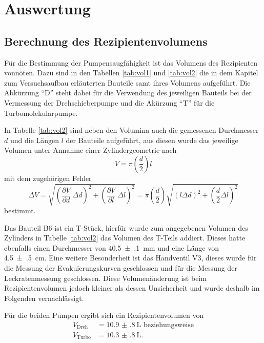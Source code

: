 \newpage
\section{Auswertung}
\label{sec:Auswertung}

\subsection{Berechnung des Rezipientenvolumens}
\label{sec:Volumina}

Für die Bestimmung der Pumpensaugfähigkeit ist das Volumens des Rezipienten
vonnöten. Dazu sind in den Tabellen \ref{tab:vol1} und \ref{tab:vol2} die
in dem Kapitel zum Versuchsaufbau erläuterten Bauteile samt ihres Volumens aufgeführt.
Die Abkürzung \enquote{D} steht dabei für die Verwendung
des jeweiligen Bauteils bei der Vermessung der
Drehschieberpumpe und die Akürzung \enquote{T} für die Turbomolekularpumpe.



In Tabelle \ref{tab:vol2} sind neben den Volumina auch die gemessenen
Durchmesser $d$ und die Längen $l$ der Bauteile aufgeführt, aus diesen wurde
das jeweilige Volumen unter Annahme einer Zylindergeometrie nach
\begin{equation*}
  V = \pi \left(\frac{d}{2}\right) l
\end{equation*}
mit dem zugehörigen Fehler
\begin{equation*}
  \Delta V =
  \sqrt{\left(\frac{\partial V}{\partial d} \;\Delta d\right)^2 +
  \left(\frac{\partial V}{\partial l} \;\Delta l\right)^2} =
  \pi \left(\frac{d}{2}\right) \sqrt{
  \left(l \Delta d \right)^2 +
  \left( \frac{d}{2} \Delta l\right)^2}
\end{equation*}
bestimmt.



Das Bauteil B6 ist ein T-Stück, hierfür wurde zum angegebenen Volumen des Zylinders
in Tabelle \ref{tab:vol2}
das Volumen des T-Teils addiert. Dieses hatte ebenfalls einen Durchmesser
von \SI{40.5(1)}{\milli\meter} und eine Länge von \SI{4.5(5)}{\centi\meter}.
Eine weitere Besonderheit ist das Handventil V3, dieses wurde für die Messung
der Evakuierungskurven geschlossen und für die Messung der Leckratenmessung
geschlossen. Diese Volumenänderung ist beim Rezipientenvolumen jedoch kleiner
als dessen Unsicherheit und
wurde deshalb im Folgenden vernachlässigt.

Für die beiden Pumpen ergibt sich ein Rezipientenvolumen von
\begin{align*}
  V_\text{Dreh} &= \SI{10.9(8)}{\liter} \text{ beziehungsweise}\\
  V_\text{Turbo} &= \SI{10.3(8)}{\liter}.
\end{align*}



